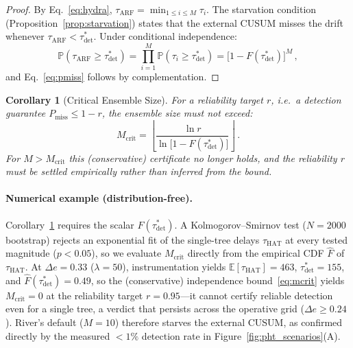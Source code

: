 \documentclass[10pt,conference]{IEEEtran}
\newtheorem{corollary}[theorem]{Corollary}
\theoremstyle{definition}
\begin{document}
\begin{proof}
  By Eq.~\eqref{eq:hydra}, $\tau_{\mathrm{ARF}} = \min_{1 \le i \le M} \tau_i$.
  The starvation condition (Proposition~\ref{prop:starvation}) states that the external CUSUM misses the drift whenever $\tau_{\mathrm{ARF}} < \tau_{\mathrm{det}}^*$.
  Under conditional independence:
  \[
    \mathbb{P}\!\left(\tau_{\mathrm{ARF}} \ge \tau_{\mathrm{det}}^*\right) = \prod_{i=1}^{M} \mathbb{P}\!\left(\tau_i \ge \tau_{\mathrm{det}}^*\right) = \bigl[1 - F(\tau_{\mathrm{det}}^*)\bigr]^M\,,
  \]
  and Eq.~\eqref{eq:pmiss} follows by complementation.
\end{proof}

\begin{corollary}[Critical Ensemble Size]\label{cor:mcrit}
  For a reliability target $r$, i.e.\ a detection guarantee $P_{\mathrm{miss}} \le 1 - r$, the ensemble size must not exceed:
  \begin{equation}\label{eq:mcrit}
    M_{\mathrm{crit}} = \left\lfloor \frac{\ln r}{\ln\!\bigl[1 - F(\tau_{\mathrm{det}}^*)\bigr]} \right\rfloor\,.
  \end{equation}
  For $M > M_{\mathrm{crit}}$ this (conservative) certificate no longer holds, and the reliability $r$ must be settled empirically rather than inferred from the bound.
\end{corollary}

\paragraph{Numerical example (distribution-free).}
Corollary~\ref{cor:mcrit} requires the scalar $F(\tau_{\mathrm{det}}^*)$. A Kolmogorov--Smirnov test ($N{=}2000$ bootstrap) rejects an exponential fit of the single-tree delays $\tau_{\mathrm{HAT}}$ at every tested magnitude ($p<0.05$), so we evaluate $M_{\mathrm{crit}}$ directly from the empirical CDF $\widehat{F}$ of $\tau_{\mathrm{HAT}}$.
At $\Delta e = 0.33$ ($\lambda=50$), instrumentation yields $\mathbb{E}[\tau_{\mathrm{HAT}}] = 463$, $\tau_{\mathrm{det}}^* = 155$, and $\widehat{F}(\tau_{\mathrm{det}}^*) = 0.49$, so the (conservative) independence bound~\eqref{eq:mcrit} yields $M_{\mathrm{crit}} = 0$ at the reliability target $r = 0.95$---it cannot certify reliable detection even for a single tree, a verdict that persists across the operative grid ($\Delta e \ge 0.24$).
River's default ($M=10$) therefore starves the external CUSUM, as confirmed directly by the measured ${<}1\%$ detection rate in Figure~\ref{fig:pht_scenarios}(A).
\end{document}
